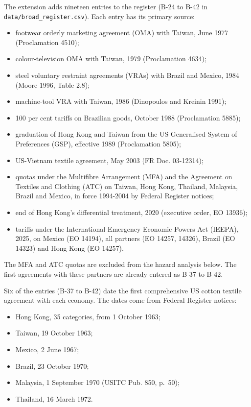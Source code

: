 The extension adds nineteen entries to the register (B-24 to B-42 in
\texttt{data/\allowbreak{}broad\_\allowbreak{}register.csv}). Each entry has its primary source:

\begin{itemize}
\tightlist
\item
  footwear orderly marketing agreement (OMA) with Taiwan, June 1977
  (Proclamation 4510);
\item
  colour-television OMA with Taiwan, 1979 (Proclamation 4634);
\item
  steel voluntary restraint agreements (VRAs) with Brazil and Mexico,
  1984 (Moore 1996, Table 2.8);
\item
  machine-tool VRA with Taiwan, 1986 (Dinopoulos and Kreinin 1991);
\item
  100 per cent tariffs on Brazilian goods, October 1988 (Proclamation
  5885);
\item
  graduation of Hong Kong and Taiwan from the US Generalised System of
  Preferences (GSP), effective 1989 (Proclamation 5805);
\item
  US-Vietnam textile agreement, May 2003 (FR Doc. 03-12314);
\item
  quotas under the Multifibre Arrangement (MFA) and the Agreement on
  Textiles and Clothing (ATC) on Taiwan, Hong Kong, Thailand, Malaysia,
  Brazil and Mexico, in force 1994-2004 by Federal Register notices;
\item
  end of Hong Kong's differential treatment, 2020 (executive order, EO
  13936);
\item
  tariffs under the International Emergency Economic Powers Act (IEEPA),
  2025, on Mexico (EO 14194), all partners (EO 14257, 14326), Brazil (EO
  14323) and Hong Kong (EO 14257).
\end{itemize}

The MFA and ATC quotas are excluded from the hazard analysis below. The
first agreements with these partners are already entered as B-37 to
B-42.

Six of the entries (B-37 to B-42) date the first comprehensive US cotton
textile agreement with each economy. The dates come from Federal
Register notices:

\begin{itemize}
\tightlist
\item
  Hong Kong, 35 categories, from 1 October 1963;
\item
  Taiwan, 19 October 1963;
\item
  Mexico, 2 June 1967;
\item
  Brazil, 23 October 1970;
\item
  Malaysia, 1 September 1970 (USITC Pub. 850, p.~50);
\item
  Thailand, 16 March 1972.
\end{itemize}

